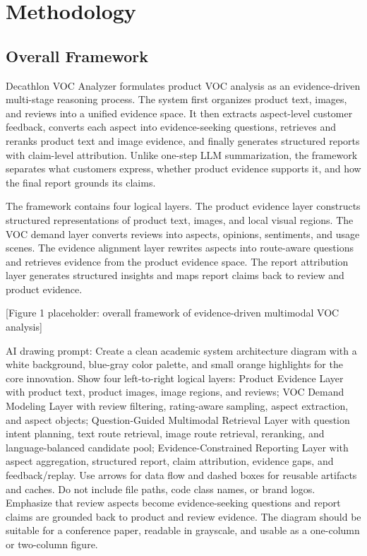 \documentclass[11pt]{article}
\begin{document}
\section{Methodology}
\subsection{Overall Framework}

Decathlon VOC Analyzer formulates product VOC analysis as an evidence-driven multi-stage reasoning process. The system first organizes product text, images, and reviews into a unified evidence space. It then extracts aspect-level customer feedback, converts each aspect into evidence-seeking questions, retrieves and reranks product text and image evidence, and finally generates structured reports with claim-level attribution. Unlike one-step LLM summarization, the framework separates what customers express, whether product evidence supports it, and how the final report grounds its claims.

The framework contains four logical layers. The product evidence layer constructs structured representations of product text, images, and local visual regions. The VOC demand layer converts reviews into aspects, opinions, sentiments, and usage scenes. The evidence alignment layer rewrites aspects into route-aware questions and retrieves evidence from the product evidence space. The report attribution layer generates structured insights and maps report claims back to review and product evidence.

{[}Figure 1 placeholder: overall framework of evidence-driven multimodal VOC analysis{]}

AI drawing prompt: Create a clean academic system architecture diagram with a white background, blue-gray color palette, and small orange highlights for the core innovation. Show four left-to-right logical layers: Product Evidence Layer with product text, product images, image regions, and reviews; VOC Demand Modeling Layer with review filtering, rating-aware sampling, aspect extraction, and aspect objects; Question-Guided Multimodal Retrieval Layer with question intent planning, text route retrieval, image route retrieval, reranking, and language-balanced candidate pool; Evidence-Constrained Reporting Layer with aspect aggregation, structured report, claim attribution, evidence gaps, and feedback/replay. Use arrows for data flow and dashed boxes for reusable artifacts and caches. Do not include file paths, code class names, or brand logos. Emphasize that review aspects become evidence-seeking questions and report claims are grounded back to product and review evidence. The diagram should be suitable for a conference paper, readable in grayscale, and usable as a one-column or two-column figure.
\end{document}

